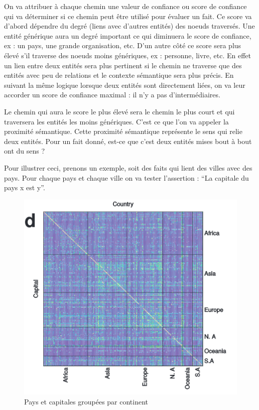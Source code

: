 On va attribuer à chaque chemin une valeur de confiance ou score de confiance qui va déterminer si ce chemin peut être utilisé pour évaluer un fait. Ce score va d'abord dépendre du degré (liens avec d'autres entités) des noeuds traversés. Une entité générique aura un degré important ce qui diminuera le score de confiance, ex : un pays, une grande organisation, etc. D'un autre côté ce score sera plus élevé s'il traverse des noeuds moins génériques, ex : personne, livre, etc. En effet un lien entre deux entités sera plus pertinent si le chemin ne traverse que des entités avec peu de relations et le contexte sémantique sera plus précis. En suivant la même logique lorsque deux entités sont directement liées, on va leur accorder un score de confiance maximal : il n'y a pas d'intermédiaires.

Le chemin qui aura le score le plus élevé sera le chemin le plus court et qui traversera les entités les moins génériques. C'est ce que l'on va appeler la proximité sémantique. Cette proximité sémantique représente le sens qui relie deux entités. Pour un fait donné, est-ce que c'est deux entités mises bout à bout ont du sens ? 

Pour illustrer ceci, prenons un exemple, soit des faits qui lient des villes avec des pays. Pour chaque pays et chaque ville on va tester l'assertion : \enquote{La capitale du pays x est y}.

\begin{figure}[h]
\centering
\includegraphics[draft=false, scale=0.5]{imgs/country_cap_check.PNG}
\caption{Pays et capitales groupées par continent}
\label{fig1}
\end{figure}

